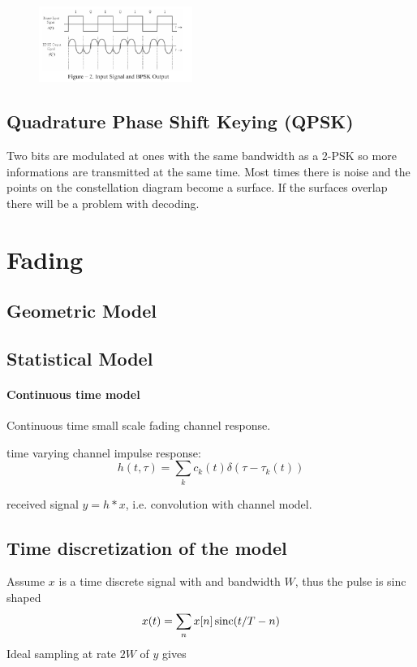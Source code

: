 \begin{figure}
	\includegraphics[width=5cm]{./image/BPSK2.png}
\end{figure}

\subsection{Quadrature Phase Shift Keying (QPSK)}

Two bits are modulated at ones with the same bandwidth as a 2-PSK so more informations are transmitted at the same time. \cite{Meyer2011}
Most times there is noise and the points on the constellation diagram become a surface. 
If the surfaces overlap there will be a problem with decoding. 

\section{Fading}

\subsection{Geometric Model}


\subsection{Statistical Model}


\paragraph{Continuous time model}

Continuous time small scale fading channel response.

time varying channel impulse response:
\begin{equation}
	h(t, \tau) = \sum_k c_k (t) \delta(\tau - \tau_k(t))
\end{equation}

received signal \(y = h * x\), i.e. convolution with channel model. 

\subsection{Time discretization of the model}


Assume \(x\) is a time discrete signal with and bandwidth \(W\), thus the pulse is sinc shaped
\begin{equation}
	x(t) = \sum_n x[n] \operatorname{sinc}(t/T - n)
\end{equation}
Ideal sampling at rate \(2W\) of \(y\) gives
